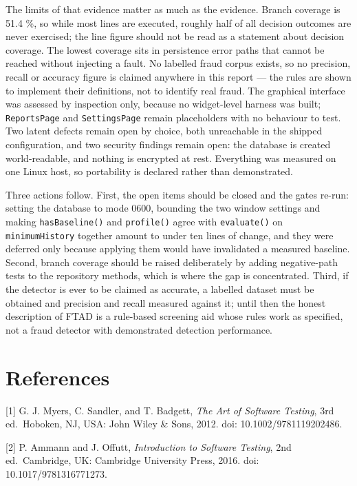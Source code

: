 \documentclass[
  12pt,
]{report}
\begin{document}
The limits of that evidence matter as much as the evidence. Branch
coverage is 51.4 \%, so while most lines are executed, roughly half of
all decision outcomes are never exercised; the line figure should not be
read as a statement about decision coverage. The lowest coverage sits in
persistence error paths that cannot be reached without injecting a
fault. No labelled fraud corpus exists, so no precision, recall or
accuracy figure is claimed anywhere in this report --- the rules are
shown to implement their definitions, not to identify real fraud. The
graphical interface was assessed by inspection only, because no
widget-level harness was built; \texttt{ReportsPage} and
\texttt{SettingsPage} remain placeholders with no behaviour to test. Two
latent defects remain open by choice, both unreachable in the shipped
configuration, and two security findings remain open: the database is
created world-readable, and nothing is encrypted at rest. Everything was
measured on one Linux host, so portability is declared rather than
demonstrated.

Three actions follow. First, the open items should be closed and the
gates re-run: setting the database to mode 0600, bounding the two window
settings and making \texttt{hasBaseline()} and \texttt{profile()} agree
with \texttt{evaluate()} on \texttt{minimumHistory} together amount to
under ten lines of change, and they were deferred only because applying
them would have invalidated a measured baseline. Second, branch coverage
should be raised deliberately by adding negative-path tests to the
repository methods, which is where the gap is concentrated. Third, if
the detector is ever to be claimed as accurate, a labelled dataset must
be obtained and precision and recall measured against it; until then the
honest description of FTAD is a rule-based screening aid whose rules
work as specified, not a fraud detector with demonstrated detection
performance.

\clearpage

\section{References}\label{references}

{[}1{]} G. J. Myers, C. Sandler, and T. Badgett, \emph{The Art of
Software Testing}, 3rd ed.~Hoboken, NJ, USA: John Wiley \& Sons, 2012.
doi: 10.1002/9781119202486.

{[}2{]} P. Ammann and J. Offutt, \emph{Introduction to Software
Testing}, 2nd ed.~Cambridge, UK: Cambridge University Press, 2016. doi:
10.1017/9781316771273.
\end{document}
